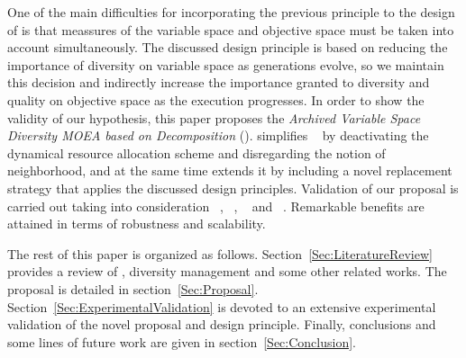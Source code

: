 One of the main difficulties for incorporating the previous principle to the design of \MOEAS{} is that
meassures of the variable space and objective space must be taken into account simultaneously.
%
The discussed design principle is based on reducing the importance of diversity on variable space as 
generations evolve, so we maintain this decision and indirectly increase the importance granted to diversity 
and quality on objective space as the execution progresses.
%
%
In order to show the validity of our hypothesis, this paper proposes the
\textit{Archived Variable Space Diversity MOEA based on Decomposition} (\AVSDMOEAD{}).
%
\AVSDMOEAD{} simplifies \MOEADDE{}~\cite{zhang2009performance} by deactivating the dynamical resource allocation
scheme and disregarding the notion of neighborhood,
and at the same
time extends it by including a novel replacement strategy that applies the discussed design principles.
%
Validation of our proposal is carried out taking into consideration 
\MOEADDE{}~\cite{zhang2009performance}, 
\NSGAII{}~\cite{deb2002fast}, 
\REMOA{}~\cite{trautmann2013r2} and 
\NSGAIII{}~\cite{deb2013evolutionary}.
%
Remarkable benefits are attained in terms of robustness and scalability.

The rest of this paper is organized as follows.
%
Section~\ref{Sec:LiteratureReview} provides a review of \MOEAS{}, diversity management 
and some other related works.
%
The \AVSDMOEAD{} proposal is detailed in section~\ref{Sec:Proposal}.
%
Section~\ref{Sec:ExperimentalValidation} is devoted to an extensive experimental validation of the novel proposal and
design principle.
%
Finally, conclusions and some lines of future work are given in section~\ref{Sec:Conclusion}.
%
